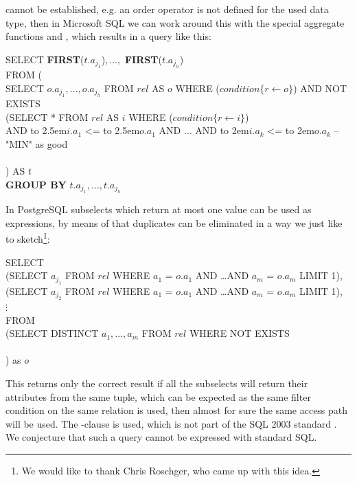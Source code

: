cannot be established, e.g. an order operator is not defined for the
used data type, then in Microsoft SQL we can work around this with the
special aggregate functions  and ,
which results in a query like this:
%
\begin{sql}
\newcommand\abox[1]{\hbox to 2.5em{#1\hfil}}%
\newcommand\bbox[1]{\hbox to 2em{#1\hfil}}%
SELECT \textbf{FIRST}($t.a_{j_1}$)$, \ldots, $ \textbf{FIRST}($t.a_{j_h}$) \\
FROM (\\
SELECT $o.a_{j_1}, \ldots, o.a_{j_h}$ FROM $rel$ AS $o$ WHERE ($condition\{r \gets o\}$) AND NOT EXISTS \\
(SELECT * FROM $rel$ AS $i$ WHERE ($condition\{r \gets i\}$) \\
AND \abox{$i.a_1$} <= \abox{$o.a_1$} AND $\ldots$ AND \bbox{$i.a_k$} <= \bbox{$o.a_k$} -- "MIN" as good\\
 \\
) AS $t$ \\
\textbf{GROUP BY} $t.a_{j_1}, \ldots, t.a_{j_h}$
\end{sql}

In PostgreSQL subselects which return at most one value can be used as
expressions, by means of that duplicates can be eliminated in a way we
just like to sketch\footnote{We would like to thank Chris Roschger,
who came up with this idea.}:

\begin{sql}
SELECT \\
(SELECT $a_{j_1}$ FROM $rel$ WHERE $a_1$ = $o.a_1$ AND \ldots AND $a_m$ = $o.a_m$ LIMIT 1), \\
(SELECT $a_{j_2}$ FROM $rel$ WHERE $a_1$ = $o.a_1$ AND \ldots AND $a_m$ = $o.a_m$ LIMIT 1), \\
$\vdots$ \\
FROM\\
(SELECT DISTINCT $a_1, \ldots, a_m$ FROM $rel$ WHERE NOT EXISTS\\
 \\
) as $o$
\end{sql}

This returns only the correct result if all the subselects will return
their attributes from the same tuple, which can be expected as the same
filter condition on the same relation is used, then almost for sure
the same access path will be used.  The -clause is
used, which is not part of the SQL 2003 standard \citep{SQL2003}. We conjecture that
such a query cannot be expressed with standard SQL.

